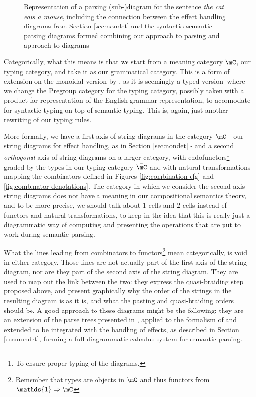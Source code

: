\begin{figure}
	\centering
	\caption{Representation of a parsing (sub-)diagram for the sentence
		\emph{the cat eats a mouse}, including the connection between the effect
		handling diagrams from Section \ref{sec:nondet} and the syntactio-semantic
		parsing diagrams formed combining our approach to parsing and
		\cite{coeckeMathematicalFoundationsCompositional2010} approach to diagrams}
	\label{fig:parsing-diagram}
\end{figure}

Categorically, what this means is that we start from a meaning category $\mC$,
our typing category, and take it as our grammatical category.
This is a form of extension on the monoidal version by
, as it is seemingly a
typed version, where we change the Pregroup category for the typing category,
possibly taken with a product for representation of the English grammar
representation, to accomodate for syntactic typing on top of semantic typing.
This is, again, just another rewriting of our typing rules.

More formally, we have a first axis of string diagrams in the category
$\mC$ - our string diagrams for effect handling, as in Section
\ref{sec:nondet} - and a second \emph{orthogonal} axis of string diagrams
on a larger category, with endofunctors\footnote{To ensure proper typing of the
	diagrams.} graded by the types in our typing category $\bar{\mC}$ and
with natural transformations mapping the combinators defined in Figures
\ref{fig:combination-cfg} and \ref{fig:combinator-denotations}.
The category in which we consider the second-axis string diagrams does not have
a meaning in our compositional semantics theory, and to be more precise, we
should talk about $1$-cells and $2$-cells instead of functors and natural
transformations, to keep in the idea that this is really just a diagrammatic
way of computing and presenting the operations that are put to work during
semantic parsing.

\medskip

What the lines leading from combinators to functors\footnote{Remember that
	types are objects in $\mC$ and thus functors from
	$\mathds{1} \Rightarrow \mC$} mean categorically, is void in either category.
Those lines are not actually part of the first axis of the string diagram,
nor are they part of the second axis of the string diagram.
They are used to map out the link between the two: they express the
quasi-braiding step proposed above, and present graphically why the order of
the strings in the resulting diagram is as it is, and what the pasting and
quasi-braiding orders should be.
A good approach to these diagrams might be the following: they are an extension
of the parse trees presented in
, applied to the
formalism of  and
extended to be integrated with the handling of effects,
as described in Section \ref{sec:nondet}, forming a full diagrammatic calculus
system for semantic parsing.

